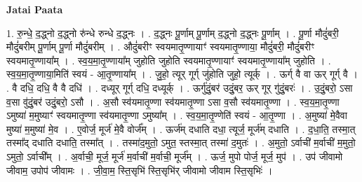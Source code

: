 \documentclass[17pt]{extarticle}
\begin{document}
\textbf{Jatai Paata} \newline

1. रु॒न्धे॒ द॒द्ध्नो द॒द्ध्नो रु॑न्धे रुन्धे द॒द्ध्नः । . द॒द्ध्नः पू॒र्णाम् पू॒र्णाम् द॒द्ध्नो द॒द्ध्नः पू॒र्णाम् । . पू॒र्णा मौदुं॑बरी॒ मौदुं॑बरीम् पू॒र्णाम् पू॒र्णा मौदुं॑बरीम् । . औदुं॑बरीꣳ स्वयमातृ॒ण्णायाꣳ॑ स्वयमातृ॒ण्णाया॒ मौदुं॑बरी॒ मौदुं॑बरीꣳ स्वयमातृ॒ण्णाया᳚म् । . स्व॒य॒मा॒तृ॒ण्णाया᳚म् जुहोति जुहोति स्वयमातृ॒ण्णायाꣳ॑ स्वयमातृ॒ण्णाया᳚म् जुहोति । . स्व॒य॒मा॒तृ॒ण्णाया॒मिति॑ स्वयं - आ॒तृ॒ण्णाया᳚म् । . जु॒हो॒ त्यूर् गूर्ग् जु॑होति जुहो॒ त्यूर्क् । . ऊर्ग् वै वा ऊर् गूर्ग् वै । . वै दधि॒ दधि॒ वै वै दधि॑ । . दध्यूर् गूर्ग् दधि॒ दध्यूर्क् । . ऊर्गु॑दुं॒बर॑ उदुं॒बर॒ ऊर् गूर् गु॑दुं॒बरः॑ । . उ॒दुं॒बरो॒ ऽसा व॒सा वु॑दुं॒बर॑ उदुं॒बरो॒ ऽसौ । . अ॒सौ स्व॑यमातृ॒ण्णा स्व॑यमातृ॒ण्णा ऽसा व॒सौ स्व॑यमातृ॒ण्णा । . स्व॒य॒मा॒तृ॒ण्णा ऽमुष्या॑ म॒मुष्याꣳ॑ स्वयमातृ॒ण्णा स्व॑यमातृ॒ण्णा ऽमुष्या᳚म् । . स्व॒य॒मा॒तृ॒ण्णेति॑ स्वयं - आ॒तृ॒ण्णा । . अ॒मुष्या॑ मे॒वैवा मुष्या॑ म॒मुष्या॑ मे॒व । . ए॒वोर्ज॒ मूर्ज॑ मे॒वै वोर्ज᳚म् । . ऊर्ज॑म् दधाति दधा॒ त्यूर्ज॒ मूर्ज॑म् दधाति । . द॒धा॒ति॒ तस्मा॒त् तस्मा᳚द् दधाति दधाति॒ तस्मा᳚त् । . तस्मा॑द॒मुतो॒ ऽमुत॒ स्तस्मा॒त् तस्मा॑ द॒मुतः॑ । . अ॒मुतो॒ ऽर्वाची॑ म॒र्वाची॑ म॒मुतो॒ ऽमुतो॒ ऽर्वाची᳚म् । . अ॒र्वाची॒ मूर्ज॒ मूर्ज॑ म॒र्वाची॑ म॒र्वाची॒ मूर्ज᳚म् । . ऊर्ज॒ मुपो पोर्ज॒ मूर्ज॒ मुप॑ । . उप॑ जीवामो जीवाम॒ उपोप॑ जीवामः । . जी॒वा॒म॒ स्ति॒सृभि॑ स्ति॒सृभि॑र् जीवामो जीवाम स्ति॒सृभिः॑ । \newline
\end{document}
